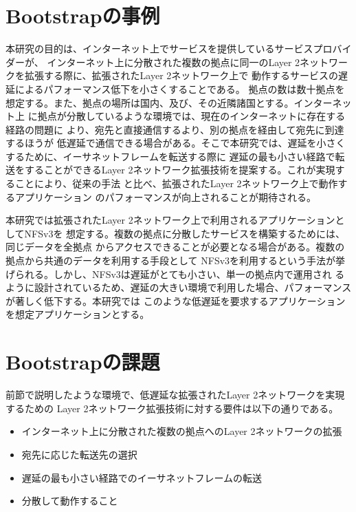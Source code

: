 \section{Bootstrapの事例}
\label{solv:env}

本研究の目的は、インターネット上でサービスを提供しているサービスプロバイダーが、
インターネット上に分散された複数の拠点に同一のLayer 2ネットワークを拡張する際に、拡張されたLayer 2ネットワーク上で
動作するサービスの遅延によるパフォーマンス低下を小さくすることである。
拠点の数は数十拠点を想定する。また、拠点の場所は国内、及び、その近隣諸国とする。インターネット上
に拠点が分散しているような環境では、現在のインターネットに存在する経路の問題に
より、宛先と直接通信するより、別の拠点を経由して宛先に到達するほうが
低遅延で通信できる場合がある。そこで本研究では、遅延を小さくするために、イーサネットフレームを転送する際に
遅延の最も小さい経路で転送をすることができるLayer 2ネットワーク拡張技術を提案する。これが実現することにより、従来の手法
と比べ、拡張されたLayer 2ネットワーク上で動作するアプリケーション
のパフォーマンスが向上されることが期待される。

本研究では拡張されたLayer 2ネットワーク上で利用されるアプリケーションとしてNFSv3を
想定する。複数の拠点に分散したサービスを構築するためには、同じデータを全拠点
からアクセスできることが必要となる場合がある。複数の拠点から共通のデータを利用する手段として
NFSv3を利用するという手法が挙げられる。しかし、NFSv3は遅延がとても小さい、単一の拠点内で運用され
るように設計されているため、遅延の大きい環境で利用した場合、パフォーマンスが著しく低下する。本研究では
このような低遅延を要求するアプリケーションを想定アプリケーションとする。

\section{Bootstrapの課題}
\label{solv:requirements}

前節で説明したような環境で、低遅延な拡張されたLayer 2ネットワークを実現するための
Layer 2ネットワーク拡張技術に対する要件は以下の通りである。

\begin{itemize}
	\item{インターネット上に分散された複数の拠点へのLayer 2ネットワークの拡張}
	\item{宛先に応じた転送先の選択}
	\item{遅延の最も小さい経路でのイーサネットフレームの転送}
	\item{分散して動作すること}
\end{itemize}

